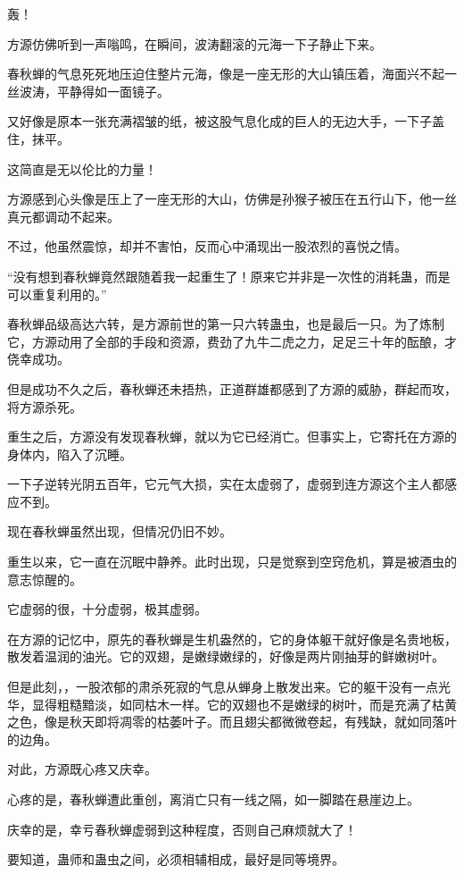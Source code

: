 \begin{this_body}
轰！

方源仿佛听到一声嗡鸣，在瞬间，波涛翻滚的元海一下子静止下来。

春秋蝉的气息死死地压迫住整片元海，像是一座无形的大山镇压着，海面兴不起一丝波涛，平静得如一面镜子。

又好像是原本一张充满褶皱的纸，被这股气息化成的巨人的无边大手，一下子盖住，抹平。

这简直是无以伦比的力量！

方源感到心头像是压上了一座无形的大山，仿佛是孙猴子被压在五行山下，他一丝真元都调动不起来。

不过，他虽然震惊，却并不害怕，反而心中涌现出一股浓烈的喜悦之情。

“没有想到春秋蝉竟然跟随着我一起重生了！原来它并非是一次性的消耗蛊，而是可以重复利用的。”

春秋蝉品级高达六转，是方源前世的第一只六转蛊虫，也是最后一只。为了炼制它，方源动用了全部的手段和资源，费劲了九牛二虎之力，足足三十年的酝酿，才侥幸成功。

但是成功不久之后，春秋蝉还未捂热，正道群雄都感到了方源的威胁，群起而攻，将方源杀死。

重生之后，方源没有发现春秋蝉，就以为它已经消亡。但事实上，它寄托在方源的身体内，陷入了沉睡。

一下子逆转光阴五百年，它元气大损，实在太虚弱了，虚弱到连方源这个主人都感应不到。

现在春秋蝉虽然出现，但情况仍旧不妙。

重生以来，它一直在沉眠中静养。此时出现，只是觉察到空窍危机，算是被酒虫的意志惊醒的。

它虚弱的很，十分虚弱，极其虚弱。

在方源的记忆中，原先的春秋蝉是生机盎然的，它的身体躯干就好像是名贵地板，散发着温润的油光。它的双翅，是嫩绿嫩绿的，好像是两片刚抽芽的鲜嫩树叶。

但是此刻，，一股浓郁的肃杀死寂的气息从蝉身上散发出来。它的躯干没有一点光华，显得粗糙黯淡，如同枯木一样。它的双翅也不是嫩绿的树叶，而是充满了枯黄之色，像是秋天即将凋零的枯萎叶子。而且翅尖都微微卷起，有残缺，就如同落叶的边角。

对此，方源既心疼又庆幸。

心疼的是，春秋蝉遭此重创，离消亡只有一线之隔，如一脚踏在悬崖边上。

庆幸的是，幸亏春秋蝉虚弱到这种程度，否则自己麻烦就大了！

要知道，蛊师和蛊虫之间，必须相辅相成，最好是同等境界。


\end{this_body}
